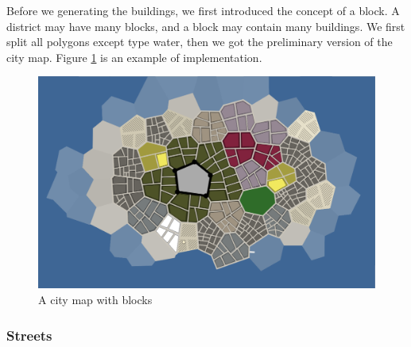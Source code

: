 Before we generating the buildings, we first introduced the concept of a block. A district may have many blocks, and a block may contain many buildings. We first split all polygons except type water, then we got the preliminary version of the city map. Figure \ref{fig:city blocks} is an example of implementation.

\begin{figure}[htbp]
  \includegraphics[width=\textwidth]{section04/assets/Map-blocks.png}
  \caption{A city map with blocks}
  \label{fig:city blocks}
\end{figure}

\subsubsection{Streets}
